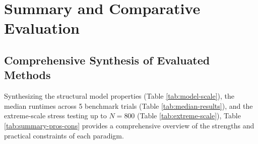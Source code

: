 \documentclass[a4paper,11pt]{article}
\begin{document}
\section{Summary and Comparative Evaluation}

\subsection{Comprehensive Synthesis of Evaluated Methods}

Synthesizing the structural model properties (Table \ref{tab:model-scale}), the median runtimes across 5 benchmark trials (Table \ref{tab:median-results}), and the extreme-scale stress testing up to $N=800$ (Table \ref{tab:extreme-scale}), Table \ref{tab:summary-pros-cons} provides a comprehensive overview of the strengths and practical constraints of each paradigm.
\end{document}
